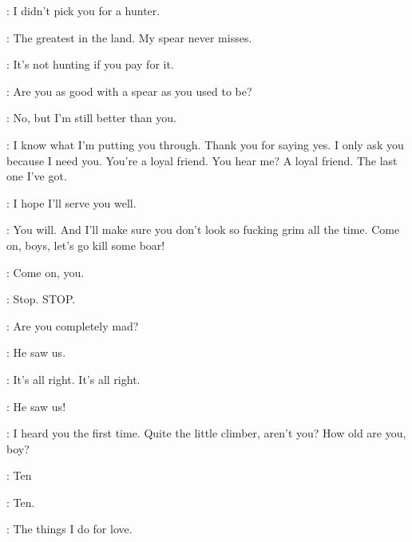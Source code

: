 \HOUND: I didn't pick you for a hunter. 

\TYRION: The greatest in the land. My spear never misses. 

\HOUND: It's not hunting if you pay for it. 


\ROBERT: Are you as good with a spear as you used to be? 

\NED: No, but I'm still better than you. 

\ROBERT: I know what I'm putting you through. Thank you for saying yes. I only ask you because I need you. You're a loyal friend. You hear me? A loyal friend. The last one I've got. 

\NED: I hope I'll serve you well. 

\ROBERT: You will. And I'll make sure you don't look so fucking grim all the time. Come on, boys, let's go kill some boar! 


\BRAN: Come on, you. 


\CERSEI:  Stop. STOP. 


\JAIME: Are you completely mad? 

\CERSEI: He saw us. 

\JAIME: It's all right. It's all right. 

\CERSEI: He saw us! 

\JAIME: I heard you the first time.  Quite the little climber, aren't you? How old are you, boy? 

\BRAN: Ten 

\JAIME: Ten. 


\JAIME: The things I do for love. 



